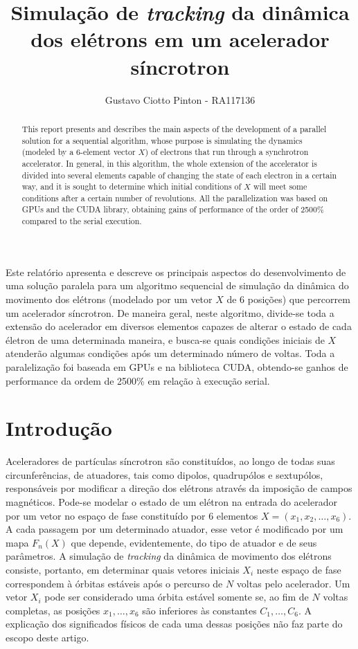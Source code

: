 \documentclass[12pt]{article}
\title{Simulação de \textit{tracking} da dinâmica dos elétrons em um acelerador
síncrotron}
\author{Gustavo Ciotto Pinton\inst{1} - RA117136 }
\begin{document}
 

\maketitle

\begin{abstract}
This report presents and describes the main aspects of the development of a
parallel solution for a sequential algorithm, whose purpose is simulating
the dynamics (modeled by a 6-element vector \(X\)) of electrons that
run through a synchrotron accelerator. In general, in this algorithm, the whole
extension of the accelerator is divided into several elements capable of
changing the state of each electron in a certain way, and it is sought to
determine which initial conditions of \(X\) will meet some conditions after a
certain number of revolutions. All the parallelization was based on GPUs and the
CUDA library, obtaining gains of performance of the order of 2500\% compared
to the serial execution.
\end{abstract}
     
\begin{resumo} 
Este relatório apresenta e descreve os principais aspectos do
desenvolvimento de uma solução paralela para um algoritmo sequencial de
simulação da dinâmica do movimento dos elétrons (modelado por um vetor \(X\) de
6 posições) que percorrem um acelerador síncrotron. De maneira geral, neste
algoritmo, divide-se toda a extensão do acelerador em diversos elementos capazes de alterar o estado de cada életron de
uma determinada maneira, e busca-se quais condições iniciais de \(X\) atenderão
algumas condições após um determinado número de voltas. Toda a paralelização foi
baseada em GPUs e na biblioteca CUDA, obtendo-se ganhos de performance da ordem
de 2500\% em relação à execução serial.
\end{resumo}


\section{Introdução}

Aceleradores de partículas síncrotron são constituídos, ao longo de todas suas
circunferências, de atuadores, tais como dipolos, quadrupólos e sextupólos,
responsáveis por modificar a direção dos elétrons através da imposição de campos
magnéticos. Pode-se modelar o estado de um elétron na entrada do acelerador por
um vetor no espaço de fase constituído por 6 elementos \( X = (x_1, x_2, \ldots,
x_6) \). A cada passagem por um determinado atuador, esse vetor é modificado por
um mapa \(F_n(X)\) que depende, evidentemente, do tipo de atuador e de seus
parâmetros. A simulação de \textit{tracking} da dinâmica de movimento dos
elétrons consiste, portanto, em determinar quais vetores iniciais \(X_i\) neste
espaço de fase correspondem à órbitas estáveis após o percurso de \(N\) voltas
pelo acelerador. Um vetor \(X_i\) pode ser considerado uma
órbita estável somente se, ao fim de \(N\) voltas completas, as posições \(x_1,
\ldots, x_6 \) são inferiores às constantes \(C_1, \ldots, C_6\). A explicação
dos significados físicos de cada uma dessas posições não faz parte do escopo
deste artigo.
\end{document}
